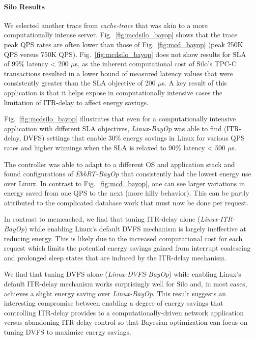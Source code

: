 \paragraph{Silo Results}
We selected another trace from \textit{cache-trace} that was akin to a more computationally intense server. Fig.~\ref{fig:mcdsilo_bayop} shows that the trace peak QPS rates are often lower than those of Fig.~\ref{fig:mcd_bayop} (peak 250K QPS versus 750K QPS). Fig.~\ref{fig:mcdsilo_bayop} does not show results for SLA of 99\% latency < 200 $\mu$s, as the inherent computational cost of Silo's TPC-C transactions resulted in a lower bound of measured latency values that were consistently greater than the SLA objective of 200 $\mu$s. A key result of this application is that it helps expose in computationally intensive cases the limitation of ITR-delay to affect energy savings.

Fig.~\ref{fig:mcdsilo_bayop} illustrates that even for a computationally intensive application with different SLA objectives, \textit{Linux-BayOp} was able to find (ITR-delay,  DVFS) settings that enable 30\% energy savings in Linux for various QPS rates and higher winnings when the SLA is relaxed to 90\% latency < 500 $\mu$s.

The controller was able to adapt to a different OS and application stack and found configurations of \textit{EbbRT-BayOp} that consistently had the lowest energy use over Linux. In contrast to Fig.~\ref{fig:mcd_bayop}, one can see larger variations in energy saved from one QPS to the next (more hilly behavior). This can be partly attributed to the complicated database work that must now be done per request.

In contrast to memcached, we find that tuning ITR-delay alone (\textit{Linux-ITR-BayOp}) while enabling Linux's default DVFS mechanism is largely ineffective at reducing energy. This is likely due to the increased computational cost for each request which limits the potential energy savings gained from interrupt coalescing and prolonged sleep states that are induced by the ITR-delay mechanism.

We find that tuning DVFS alone (\textit{Linux-DVFS-BayOp}) while enabling Linux's default ITR-delay mechanism works surprisingly well for Silo and, in most cases, achieves a slight energy saving over \textit{Linux-BayOp}. This result suggests an interesting compromise between enabling a degree of energy savings that controlling ITR-delay provides to a computationally-driven network application versus abandoning ITR-delay control so that Bayesian optimization can focus on tuning DVFS to maximize energy savings.
